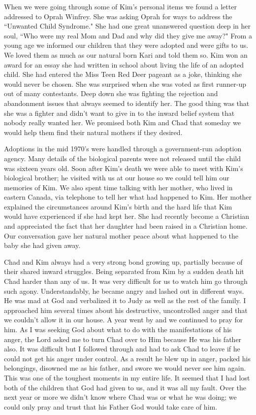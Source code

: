 \documentclass[oneside,12pt]{book}
\begin{document}
When we were going through some of Kim's personal items we found a letter addressed to Oprah Winfrey. She was asking Oprah for ways to address the ``Unwanted Child Syndrome." She had one great unanswered question deep in her soul, ``Who were my real Mom and Dad and why did they give me away?" From a young age we informed our children that they were adopted and were gifts to us. We loved them as much as our natural born Kari and told them so. Kim won an award for an essay she had written in school about living the life of an adopted child. She had entered the Miss Teen Red Deer pageant as a joke, thinking she would never be chosen. She was surprised when she was voted as first runner-up out of many contestants. Deep down she was fighting the rejection and abandonment issues that always seemed to identify her. The good thing was that she was a fighter and didn't want to give in to the inward belief system that nobody really wanted her. We promised both Kim and Chad that someday we would help them find their natural mothers if they desired. 

Adoptions in the mid 1970's were handled through a government-run adoption agency. Many details of the biological parents were not released until the child was sixteen years old. Soon after Kim's death we were able to meet with Kim's biological brother; he visited with us at our house so we could tell him our memories of Kim. We also spent time talking with her mother, who lived in eastern Canada, via telephone to tell her what had happened to Kim. Her mother explained the circumstances around Kim's birth and the hard life that Kim would have experienced if she had kept her. She had recently become a Christian and appreciated the fact that her daughter had been raised in a Christian home. Our conversation gave her natural mother peace about what happened to the baby she had given away.

Chad and Kim always had a very strong bond growing up, partially because of their shared inward struggles. Being separated from Kim by a sudden death hit Chad harder than any of us. It was very difficult for us to watch him go through such agony. Understandably, he became angry and lashed out in different ways. He was mad at God and verbalized it to Judy as well as the rest of the family. I approached him several times about his destructive, uncontrolled anger and that we couldn't allow it in our house.  A year went by and we continued to pray for him. As I was seeking God about what to do with the manifestations of his anger, the Lord asked me to turn Chad over to Him because He was his father also. It was difficult but I followed through and had to ask Chad to leave if he could not get his anger under control. As a result he blew up in anger, packed his belongings, disowned me as his father, and swore we would never see him again. This was one of the toughest moments in my entire life. It seemed that I had lost both of the children that God had given to us, and it was all my fault.  Over the next year or more we didn't know where Chad was or what he was doing; we could only pray and trust that his Father God would take care of him.
\end{document}
